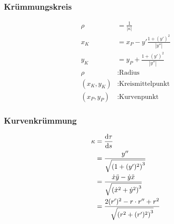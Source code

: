 \begin{multicols}{2}
\subsubsection*{Krümmungskreis}
\begin{align*} 
\rho&=\frac{1}{|\kappa|}\\
x_K&=x_P-y'\frac{1+(y')^2}{|y''|}\\
y_K&=y_P+\frac{1+(y')^2}{|y''|}\\
\rho&: \text{Radius}\\
\left(x_K, y_K \right)&: \text{Kreismittelpunkt} \\
\left( x_P, y_P \right)&: \text{Kurvenpunkt}
\end{align*}

\subsubsection*{Kurvenkrümmung}
\begin{align*} 
\kappa&=\frac{\mathop{}\!\mathrm{d} \tau}{\mathop{}\!\mathrm{d} s}\\
&=\frac{y''}{\sqrt{\left(1+(y')^2\right)^3}}\\
&=\frac{\dot{x}\ddot{y}-\dot{y}\ddot{x}}{\sqrt{\left(\dot{x}^2+\dot{y}^2\right)^3}}\\
&=\frac{2(r')^2-r\cdot r''+r^2}{\sqrt{\left(r^2+(r')^2\right)^3}}
\end{align*}
\vfill
\end{multicols}